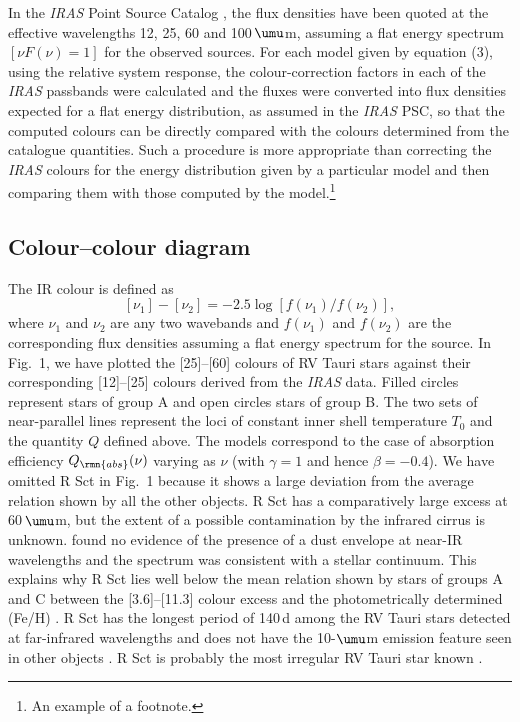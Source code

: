 \documentclass[useAMS,usedcolumn,usegraphicx,usenatbib]{mn2e}
\begin{document}
In the {\it IRAS\/} Point Source Catalog \citep[PSC,][]{b2}, the
flux densities have been quoted at the effective wavelengths 12,
25, 60 and \hbox{100\,$\umu$m}, assuming a flat energy spectrum
$[\nu F(\nu)=1]$ for the observed sources. For each model given by
equation (3), using the relative system response, the
colour-correction factors \citep{b3} in each of the {\it IRAS\/}
passbands were calculated and the fluxes were converted into flux
densities expected for a flat energy distribution, as assumed in
the {\it IRAS\/} PSC, so that the computed colours can be directly
compared with the colours determined from the catalogue
quantities. Such a procedure is more appropriate than correcting
the {\it IRAS\/} colours for the energy distribution given by a
particular model and then comparing them with those computed by
the model.\footnote{An example of a footnote.}

\subsection{Colour--colour diagram}

The IR colour is defined as
\[
  [\nu_1]-[\nu_2]=-2.5\log [f(\nu_1)/f(\nu_2)],
\]
 where $\nu_1$ and $\nu_2$ are any two wavebands and $f(\nu_1)$
and $f(\nu_2)$ are the corresponding flux  densities assuming a
flat energy spectrum for the source. In Fig.~1, we have plotted
the [25]--[60] colours  of RV Tauri stars against their
corresponding [12]--[25]  colours derived from the {\it IRAS\/}
data. Filled circles  represent stars of group A and open circles
stars of group B. The two sets of near-parallel lines represent
the loci of constant inner shell temperature $T_0$ and the
quantity $Q$ defined above. The models correspond to the case of
absorption efficiency $Q_{\rmn{abs}}(\nu)$ varying as $\nu$ (with
$\gamma=1$ and hence $\beta=-0.4$). We have omitted R Sct in
Fig.~1 because it shows a large deviation from the average
relation shown by all the other objects. R Sct has a comparatively
large excess at 60$\,\umu$m, but the extent of a possible
contamination by the infrared cirrus \citep{b16} is unknown.
\citet{b9} found no evidence of the presence of a dust envelope at
near-IR wavelengths and the spectrum was consistent with a stellar
continuum. This explains why R Sct lies well below the mean
relation shown by stars of groups A and C between the
[3.6]--[11.3] colour excess and the photometrically determined
(Fe/H) \citep{b4}. R Sct has the longest period of 140$\,$d among
the RV Tauri stars detected at far-infrared wavelengths and does
not have the 10-$\umu$m emission feature seen in other objects
\citep{b5,b19}. R Sct is probably the most irregular RV Tauri star
known \citep{b17}.
\end{document}
